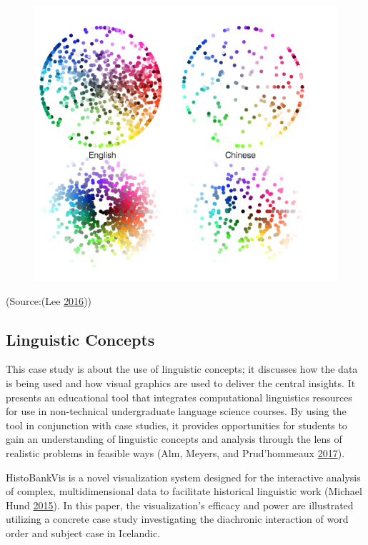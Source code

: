 \documentclass[]{book}
\theoremstyle{definition}
\theoremstyle{definition}
\theoremstyle{definition}
\theoremstyle{remark}
\begin{document}
\begin{figure}
\centering
\includegraphics{images/colorwords.png}
\caption{}
\end{figure}

(Source:(Lee \protect\hyperlink{ref-green_honey}{2016}))

\subsection{Linguistic Concepts}\label{linguistic-concepts}

This case study is about the use of linguistic concepts; it discusses
how the data is being used and how visual graphics are used to deliver
the central insights. It presents an educational tool that integrates
computational linguistics resources for use in non-technical
undergraduate language science courses. By using the tool in conjunction
with case studies, it provides opportunities for students to gain an
understanding of linguistic concepts and analysis through the lens of
realistic problems in feasible ways (Alm, Meyers, and Prud'hommeaux
\protect\hyperlink{ref-lingui_data}{2017}).

HistoBankVis is a novel visualization system designed for the
interactive analysis of complex, multidimensional data to facilitate
historical linguistic work (Michael Hund
\protect\hyperlink{ref-lingui_data1}{2015}). In this paper, the
visualization's efficacy and power are illustrated utilizing a concrete
case study investigating the diachronic interaction of word order and
subject case in Icelandic.
\end{document}
